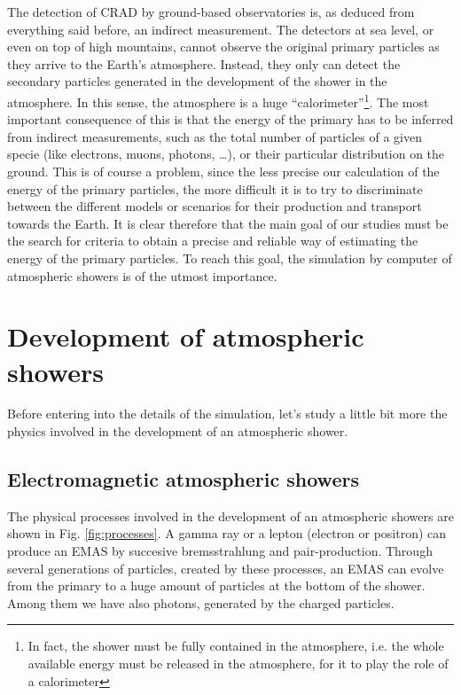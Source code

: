 The detection of CRAD by ground-based observatories is, as deduced
from everything said before, an indirect measurement. The detectors at
sea level, or even on top of high mountains, cannot observe the
original primary particles as they arrive to the Earth's atmosphere.
Instead, they only can detect the secondary particles generated in the
development of the shower in the atmosphere. In this sense, the
atmosphere is a huge ``calorimeter''\footnote{In fact, the shower must
  be fully contained in the atmosphere, i.e. the whole available
  energy must be released in the atmosphere, for it to play the role
  of a calorimeter}. The most important consequence of this is that
the energy of the primary has to be inferred from indirect
measurements, such as the total number of particles of a given specie
(like electrons, muons, photons, \ldots), or their particular
distribution on the ground. This is of course a problem, since the
less precise our calculation of the energy of the primary particles,
the more difficult it is to try to discriminate between the different
models or scenarios for their production and transport towards the
Earth.  It is clear therefore that the main goal of our studies must
be the search for criteria to obtain a precise and reliable way of
estimating the energy of the primary particles. To reach this goal,
the simulation by computer of atmospheric showers is of the utmost
importance.

\section{Development of atmospheric showers} 

Before entering into the details of the simulation, let's study a
little bit more the physics involved in the development of an
atmospheric shower.

\subsection{Electromagnetic atmospheric showers}

\toymodelfig
%
The physical processes involved in the development of an atmospheric
showers are shown in Fig. \ref{fig:processes}. A gamma ray or a lepton
(electron or positron) can produce an EMAS by succesive bremsstrahlung
and pair-production. Through several generations of particles, created
by these processes, an EMAS can evolve from the primary to a huge
amount of particles at the bottom of the shower. Among them we have
also \Cherenkov photons, generated by the charged particles.

